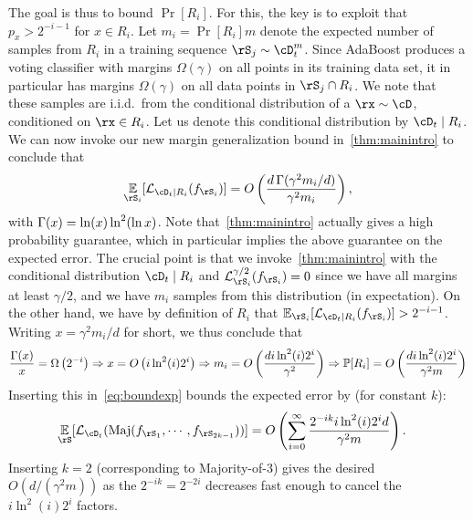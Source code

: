 The goal is thus to bound $\Pr[R_i]$. For this, the key is to exploit that $p_x > 2^{-i-1}$ for $x \in R_i$. Let $m_i = \Pr[R_i] m$ denote the expected number of samples from $R_i$ in a training sequence $\rS_j \sim \cD_t^m$. Since AdaBoost produces a voting classifier with margins $\Omega(\gamma)$ on all points in its training data set, it in particular has margins $\Omega(\gamma)$ on all data points in $\rS_j \cap R_i$. We note that these samples are i.i.d.\ from the conditional distribution of a $\rx \sim \cD$, conditioned on $\rx \in R_i$. Let us denote this conditional distribution by $\cD_t \mid R_i$. We can now invoke our new margin generalization bound in~\cref{thm:mainintro} to conclude that
\begin{align}
  \e_{\rS_i}[\ls_{\cD_t \mid R_i}(f_{\rS_i})] = O\left(\frac{d \func(\gamma^2 m_i/d)}{\gamma^2 m_i} \right), \label{eq:fromgenbound}
\end{align}
with $\operatorname{\Gamma}(x)=\ln(x)\ln^2(\ln x)$.
Note that~\cref{thm:mainintro} actually gives a high probability guarantee, which in particular implies the above guarantee on the expected error. The crucial point is that we invoke~\cref{thm:mainintro} with the conditional distribution $\cD_t \mid R_i$ and $\ls_{\rS_i}^{\gamma/2}(f_{\rS_i}) = 0$ since we have all margins at least $\gamma/2$, and we have $m_i$ samples from this distribution (in expectation). On the other hand, we have by definition of $R_i$ that $\e_{\rS_i}[\ls_{\cD_t \mid R_i}(f_{\rS_i})] > 2^{-i-1}$. Writing $x = \gamma^2 m_i/d$ for short, we thus conclude that
\begin{align*}
  \frac{\operatorname{\Gamma}(x)}{x} = \Omega\left(2^{-i}\right) \Rightarrow x = O\left(i \ln^2(i) 2^{i} \right) \Rightarrow m_i = O\left( \frac{d i \ln^2(i) 2^i}{\gamma^2}\right) \Rightarrow \operatorname*{\mathbb{P}}[R_i] = O\left( \frac{d i \ln^2(i)2^i}{\gamma^2m}\right)
\end{align*}
Inserting this in~\cref{eq:boundexp} bounds the expected error by (for constant $k$):
\begin{align}
\e_{\rS}[\ls_{\cD_t}(\maj(f_{\rS_{1}},\cdots,f_{\rS_{2k-1}}))] &= O\left( \sum_{i=0}^\infty \frac{2^{-ik} i \ln^2(i) 2^i d}{\gamma^2 m}\right).\label{eq:infsum}
\end{align}
Inserting $k=2$ (corresponding to Majority-of-3) gives the desired $O(d/(\gamma^2 m))$ as the $2^{-ik}=2^{-2i}$ decreases fast enough to cancel the $i\ln^2(i) 2^i$ factors.


